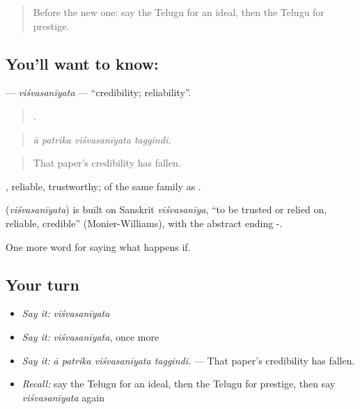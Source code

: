 \label{lesson:TE-C432-visvasaniyata}



\begin{quote}
Before the new one: say the Telugu for an ideal, then the Telugu for prestige.
\end{quote}

\subsection*{You'll want to know: }
\textbf{} — \emph{viśvasanīyata} — \textquotedblleft{}credibility; reliability\textquotedblright{}.

\begin{quote}
   .
\end{quote}

\begin{quote}
\emph{ā patrika viśvasanīyata taggindi.}
\end{quote}

\begin{quote}
That paper’s credibility has fallen.
\end{quote}

, reliable, trustworthy; of the same family as .

\begin{cousinweb}
\textbf{} (\emph{viśvasanīyata}) is built on Sanskrit \emph{viśvasanīya}, \textquotedblleft{}to be trusted or relied on, reliable, credible\textquotedblright{} (Monier-Williams), with the abstract ending -.
\end{cousinweb}

\begin{grammarlens}[title={What you've built}]
One more word for saying what happens if.
\end{grammarlens}

\subsection*{Your turn}
\begin{itemize}
\raggedright
  \item \emph{Say it:} \emph{viśvasanīyata}
  \item \emph{Say it:} \emph{viśvasanīyata}, once more
  \item \emph{Say it:} \emph{ā patrika viśvasanīyata taggindi.} — That paper’s credibility has fallen.
  \item \emph{Recall:} say the Telugu for an ideal, then the Telugu for prestige, then say \emph{viśvasanīyata} again
\end{itemize}


